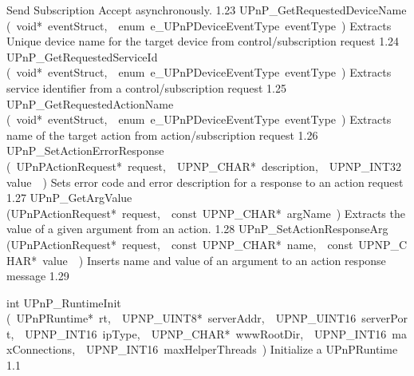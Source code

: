 \documentclass{article}
\begin{document}
\begin{cxxentry}
\begin{cxxnames}
        {Send Subscription Accept asynchronously.}
        {1.23}
        {UPnP\_GetRequestedDeviceName}
        {(\ void*\ eventStruct,\ \ enum\ e\_UPnPDeviceEventType\ eventType\ )}
        {Extracts Unique device name for the target device from control/subscription request}
        {1.24}
        {UPnP\_GetRequestedServiceId}
        {(\ void*\ eventStruct,\ \ enum\ e\_UPnPDeviceEventType\ eventType\ )}
        {Extracts service identifier from a control/subscription request}
        {1.25}
        {UPnP\_GetRequestedActionName}
        {(\ void*\ eventStruct,\ \ enum\ e\_UPnPDeviceEventType\ eventType\ )}
        {Extracts name of the target action from action/subscription request}
        {1.26}
        {UPnP\_SetActionErrorResponse}
        {(\ UPnPActionRequest*\ request,\ \ UPNP\_CHAR*\ description,\ \ UPNP\_INT32\ value\ \ )}
        {Sets error code and error description for a response to an action request}
        {1.27}
        {UPnP\_GetArgValue}
        {(UPnPActionRequest*\ request,\ \ const\ UPNP\_CHAR*\ argName\ )}
        {Extracts the value of a given argument from an action.}
        {1.28}
        {UPnP\_SetActionResponseArg}
        {(UPnPActionRequest*\ request,\ \ const\ UPNP\_CHAR*\ name,\ \ const\ UPNP\_CHAR*\ value\ \ )}
        {Inserts name and value of an argument to an action response message}
        {1.29}
\end{cxxnames}
\begin{cxxfunction}
{int}
        {UPnP\_RuntimeInit}
        {(\ UPnPRuntime*\ rt,\ \ UPNP\_UINT8*\ serverAddr,\ \ UPNP\_UINT16\ serverPort,\ \ UPNP\_INT16\ ipType,\ \ UPNP\_CHAR*\ wwwRootDir,\ \ UPNP\_INT16\ maxConnections,\ \ UPNP\_INT16\ maxHelperThreads\ )}
        {Initialize a UPnPRuntime }
        {1.1}
\begin{cxxdoc}


\end{cxxdoc}
\end{cxxfunction}
\end{cxxentry}
\end{document}
